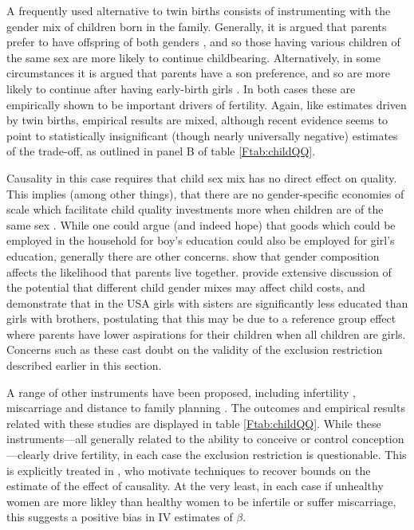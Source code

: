 A frequently used alternative to twin births consists of instrumenting with the 
gender mix of children born in the family. Generally, it is argued that parents
prefer to have offspring of both genders \citep{ConleyGlauber2006,Angristetal2010,
Beckeretal2010,MillimetWang2011,FitzsimonsMalde2014}, and so those having various 
children of the same sex are more likely to continue childbearing. Alternatively, 
in some circumstances it is argued that parents have a son preference, and so are 
more likely to continue after having early-birth girls \citep{Lee2008,
KumarKugler2011}. In both cases these are empirically shown to be important 
drivers of fertility.  Again, like estimates driven by twin births, empirical 
results are mixed, although recent evidence seems to point to statistically 
insignificant (though nearly universally negative) estimates of the trade-off, 
as outlined in panel B of table \ref{Ftab:childQQ}.

Causality in this case requires that child sex mix has no direct effect on 
quality.  This implies (among other things), that there are no gender-specific 
economies of scale which facilitate child quality investments more when children
are of the same sex \citep{ButcherCase1994}.  While one could argue (and indeed
hope) that goods which could be employed in the household for boy's education 
could also be employed for girl's education, generally there are other concerns.
\citet{DahlMoretti2008} show that gender composition affects the likelihood that
parents live together. \citet{ButcherCase1994} provide extensive discussion of 
the potential that different child gender mixes may affect child costs, and 
demonstrate that in the USA girls with sisters are significantly less educated 
than girls with brothers, postulating that this may be due to a reference group 
effect where parents have lower aspirations for their children when all children 
are girls. Concerns such as these cast doubt on the validity of the exclusion 
restriction described earlier in this section.

A range of other instruments have been proposed, including infertility
\citep{Bougmaetal2015}, miscarriage \citep{Hotzetal1997,Marlani2008,Miller2009}
and distance to family planning \citep{DangRogers2013}. The outcomes and 
empirical results related with these studies are displayed in table 
\ref{Ftab:childQQ}.  While these instruments---all generally related to the 
ability to conceive or control conception---clearly drive fertility, in each 
case the exclusion restriction is questionable.  This is explicitly treated in
\citet{Hotzetal1997}, who motivate techniques to recover bounds on the estimate
of the effect of causality.  At the very least, in each case if unhealthy
women are more likley than healthy women to be infertile or suffer miscarriage,
this suggests a positive bias in IV estimates of $\beta$.

